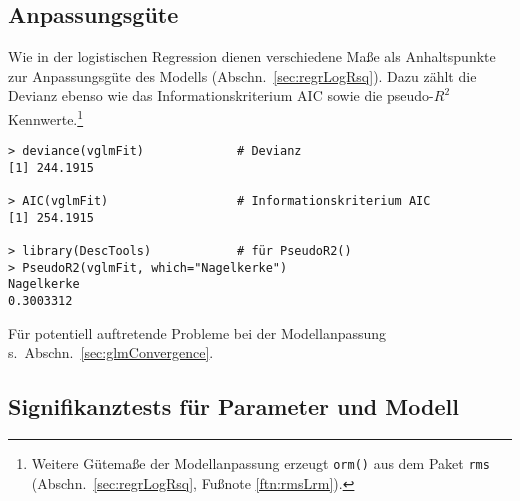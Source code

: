 \subsection{Anpassungsgüte}

Wie in der logistischen Regression dienen verschiedene Maße als Anhaltspunkte zur Anpassungsgüte des Modells (Abschn.\ \ref{sec:regrLogRsq}). Dazu zählt die Devianz ebenso wie das Informationskriterium AIC sowie die pseudo-$R^{2}$ Kennwerte.\footnote{Weitere Gütemaße der Modellanpassung erzeugt \lstinline!orm()! aus dem Paket \lstinline!rms! (Abschn.\ \ref{sec:regrLogRsq}, Fußnote \ref{ftn:rmsLrm}).}
\begin{lstlisting}
> deviance(vglmFit)             # Devianz
[1] 244.1915

> AIC(vglmFit)                  # Informationskriterium AIC
[1] 254.1915

> library(DescTools)            # für PseudoR2()
> PseudoR2(vglmFit, which="Nagelkerke")
Nagelkerke 
0.3003312
\end{lstlisting}

Für potentiell auftretende Probleme bei der Modellanpassung s.\ Abschn.\ \ref{sec:glmConvergence}.

\subsection{Signifikanztests für Parameter und Modell}


